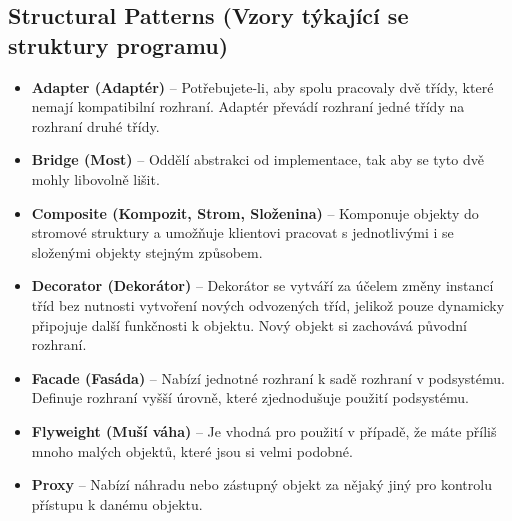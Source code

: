 \subsection{Structural Patterns (Vzory týkající se struktury programu)}
\begin{itemize}
    \item \textbf{Adapter (Adaptér)} -- Potřebujete-li, aby spolu pracovaly dvě třídy, které nemají kompatibilní rozhraní. Adaptér převádí rozhraní jedné třídy na rozhraní druhé třídy.
    \item \textbf{Bridge (Most)} -- Oddělí abstrakci od implementace, tak aby se tyto dvě mohly libovolně lišit.
    \item \textbf{Composite (Kompozit, Strom, Složenina)} -- Komponuje objekty do stromové struktury a umožňuje klientovi pracovat s jednotlivými i se složenými objekty stejným způsobem.
    \item \textbf{Decorator (Dekorátor)} -- Dekorátor se vytváří za účelem změny instancí tříd bez nutnosti vytvoření nových odvozených tříd, jelikož pouze dynamicky připojuje další funkčnosti k objektu. Nový objekt si zachovává původní rozhraní.
    \item \textbf{Facade (Fasáda)} -- Nabízí jednotné rozhraní k sadě rozhraní v podsystému. Definuje rozhraní vyšší úrovně, které zjednodušuje použití podsystému.
    \item \textbf{Flyweight (Muší váha)} -- Je vhodná pro použití v případě, že máte příliš mnoho malých objektů, které jsou si velmi podobné.
    \item \textbf{Proxy} -- Nabízí náhradu nebo zástupný objekt za nějaký jiný pro kontrolu přístupu k danému objektu.
\end{itemize}

